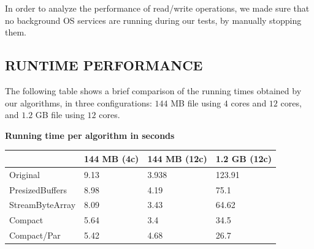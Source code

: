 \documentclass[a4paper,twoside]{article}
\begin{document}
In order to analyze the performance of read/write operations, we made sure that no background OS services are running during our tests, by manually stopping them.




\subsection{\uppercase{Runtime performance}}\label{subsec:uppercase9}

The following table shows a brief comparison of the running times obtained by our algorithms, in three configurations: $144$ MB file using $4$ cores and $12$ cores, and $1.2$ GB file using $12$ cores. 

\begin{small}
\par
\begin{center}
\textbf{Running time per algorithm in seconds} \\
\begin{tabular}{|C{2cm}|C{1.2cm}|C{1.2cm}|C{1.2cm}|}
\hline
						& 144 MB (4c)	& 144 MB (12c)		& 1.2 GB (12c)	\\ \hline
Original				& 9.13 			& 3.938 			& 123.91 		\\ \hline
PresizedBuffers			& 8.98 			& 4.19 				& 75.1 			\\ \hline
StreamByteArray			& 8.09 			& 3.43 				& 64.62 		\\ \hline
Compact 				& 5.64 			& 3.4 	 			& 34.5			\\ \hline
Compact/Par 			& 5.42		    & 4.68				& 26.7 			\\ \hline
\end{tabular}
\end{center}
\end{small}
\end{document}

